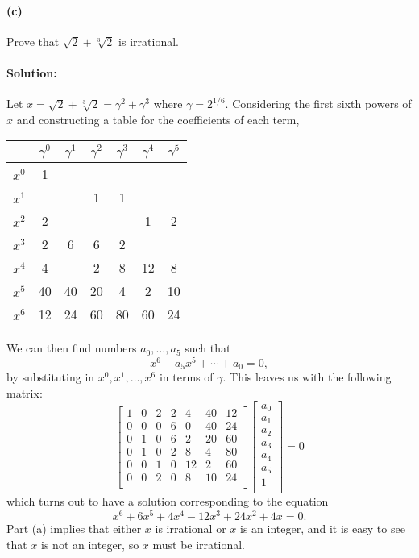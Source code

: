 \documentclass{article}
\begin{document}
\paragraph{(c)} Prove that $\sqrt{2} + \sqrt[3]{2}$ is irrational.

\paragraph{Solution:} Let $x = \sqrt{2} + \sqrt[3]{2} = \gamma^2 +
\gamma^3$ where $\gamma = 2^{1/6}$. Considering the first sixth powers of $x$
and constructing a table for the coefficients of each term,

\begin{tabular}{c | c c c c c c}
  & $\gamma^0$ & $\gamma^1$ & $\gamma^2$ & $\gamma^3$ & $\gamma^4$ & $\gamma^5$
  \\
  \hline
  $x^0$ & 1 & & & & & \\
  $x^1$ & & & 1 & 1 & & \\
  $x^2$ & 2 & & & & 1 & 2 \\
  $x^3$ & 2 & 6 & 6 & 2 & & \\
  $x^4$ & 4 & & 2 & 8 & 12 & 8 \\
  $x^5$ & 40 & 40 & 20 & 4 & 2 & 10 \\
  $x^6$ & 12 & 24 & 60 & 80 & 60 & 24 \\
\end{tabular}

We can then find numbers $a_0, \ldots, a_5$ such that \begin{equation*}
  x^6 + a_5x^5 + \cdots + a_0 = 0,
\end{equation*} by substituting in $x^0, x^1, \ldots, x^6$ in terms of
$\gamma$. This leaves us with the following matrix: \begin{equation*}
  \begin{bmatrix}
    1 & 0 & 2 & 2 & 4 & 40 & 12 \\
    0 & 0 & 0 & 6 & 0 & 40 & 24 \\
    0 & 1 & 0 & 6 & 2 & 20 & 60 \\
    0 & 1 & 0 & 2 & 8 & 4 & 80 \\
    0 & 0 & 1 & 0 & 12 & 2 & 60 \\
    0 & 0 & 2 & 0 & 8 & 10 & 24 \\
  \end{bmatrix} \begin{bmatrix}
    a_0 \\
    a_1 \\
    a_2 \\
    a_3 \\
    a_4 \\
    a_5 \\
    1 \\
  \end{bmatrix} = 0
\end{equation*} which turns out to have a solution corresponding to the
equation \begin{equation*}
  x^6 + 6x^5 + 4x^4 - 12x^3 + 24x^2 + 4x = 0.
\end{equation*}
Part (a) implies that either $x$ is irrational or $x$ is an integer, and it is
easy to see that $x$ is not an integer, so $x$ must be irrational.
\end{document}
